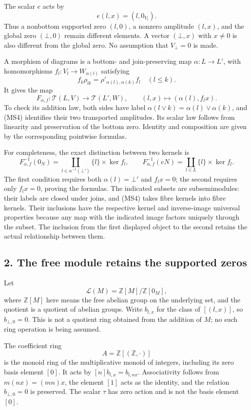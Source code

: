 \documentclass[
]{article}
\begin{document}
The scalar \(e\) acts by \[
e(l,x)=(l,0_{V_l}).
\tag{MS3}
\] Thus a nonbottom supported zero \((l,0)\), a nonzero amplitude
\((l,x)\), and the global zero \((\bot,0)\) remain different elements. A
vector \((\bot,x)\) with \(x\ne0\) is also different from the global
zero. No assumption that \(V_\bot=0\) is made.

A morphism of diagrams is a bottom- and join-preserving map
\(\alpha:L\to L'\), with homomorphisms \(f_l:V_l\to W_{\alpha(l)}\)
satisfying \[
f_k\rho_{lk}=\rho'_{\alpha(l),\alpha(k)}f_l\quad(l\le k).
\tag{MS4}
\] It gives the map \[
F_{\alpha,f}:\mathcal T(L,V)\longrightarrow\mathcal T(L',W),
\qquad (l,x)\longmapsto(\alpha(l),f_lx).
\tag{MS5}
\] To check its addition law, both sides have label
\(\alpha(l\vee k)=\alpha(l)\vee\alpha(k)\), and (MS4) identifies their
two transported amplitudes. Its scalar law follows from linearity and
preservation of the bottom zero. Identity and composition are given by
the corresponding pointwise formulas.

For completeness, the exact distinction between two kernels is \[
F_{\alpha,f}^{-1}(0_N)
=\coprod_{l\in\alpha^{-1}(\bot')}\{l\}\times\ker f_l,
\qquad
F_{\alpha,f}^{-1}(eN)
=\coprod_{l\in L}\{l\}\times\ker f_l.
\tag{MS6}
\] The first condition requires both \(\alpha(l)=\bot'\) and \(f_lx=0\);
the second requires only \(f_lx=0\), proving the formulas. The indicated
subsets are subsemimodules: their labels are closed under joins, and
(MS4) takes fibre kernels into fibre kernels. Their inclusions have the
respective kernel and inverse-image universal properties because any map
with the indicated image factors uniquely through the subset. The
inclusion from the first displayed object to the second retains the
actual relationship between them.

\subsection{2. The free module retains the supported
zeros}\label{the-free-module-retains-the-supported-zeros}

Let \[
\mathscr L(M)=\mathbb Z[M]/\mathbb Z[0_M],
\tag{MS7}
\] where \(\mathbb Z[M]\) here means the free abelian group on the
underlying set, and the quotient is a quotient of abelian groups. Write
\(b_{l,x}\) for the class of \([(l,x)]\), so \(b_{\bot,0}=0\). This is
not a quotient ring obtained from the addition of \(M\); no such ring
operation is being assumed.

The coefficient ring \[
A=\mathbb Z[(\mathbb Z,\cdot)]
\tag{MS8}
\] is the monoid ring of the multiplicative monoid of integers,
including its zero basis element \([0]\). It acts by
\([n]b_{l,x}=b_{l,nx}\). Associativity follows from \(m(nx)=(mn)x\), the
element \([1]\) acts as the identity, and the relation \(b_{\bot,0}=0\)
is preserved. The scalar \(\tau\) has zero action and is not the basis
element \([0]\).
\end{document}
